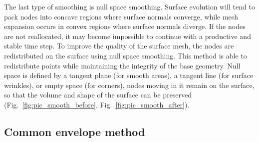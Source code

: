 \documentclass[
11pt,%
tightenlines,%
twoside,%
onecolumn,%
nofloats,%
nobibnotes,%
nofootinbib,%
superscriptaddress,%
noshowpacs,%
centertags]%
{revtex4-2}
\begin{document}
The last type of smoothing is null space smoothing.
Surface evolution will tend to pack nodes into concave regions where surface normals converge, while mesh expansion occurs in convex regions where surface normals diverge.
If the nodes are not reallocated, it may become impossible to continue with a productive and stable time step.
To improve the quality of the surface mesh, the nodes are redistributed on the surface using null space smoothing.
This method is able to redistribute points while maintaining the integrity of the base geometry.
Null space is defined by a tangent plane (for smooth areas), a tangent line (for surface wrinkles), or empty space (for corners), nodes moving in it remain on the surface, so that the volume and shape of the surface can be preserved (Fig.~\ref{fig:pic_smooth_before}, Fig.~\ref{fig:pic_smooth_after}).

\subsection{Common envelope method}
\end{document}
